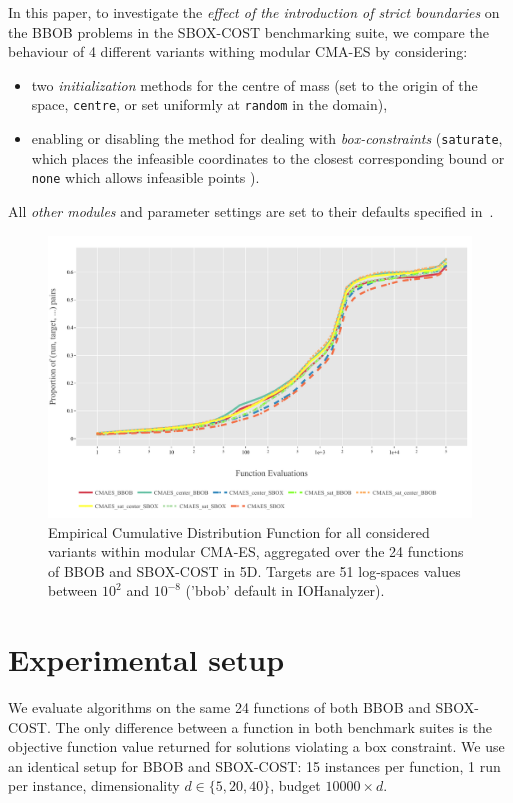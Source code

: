 \documentclass[sigconf=true, nonacm=false, review=true, anonymous = false,screen=true]{acmart}
\begin{document}
In this paper, to investigate the \textit{effect of the introduction of strict boundaries} on the BBOB problems in the SBOX-COST benchmarking suite, we compare the behaviour of 4 different variants withing modular CMA-ES by considering:
\begin{itemize}
    \item two \textit{initialization} methods for the centre of mass (set to the origin of the space, \texttt{centre}, or set uniformly at \texttt{random} in the domain),
    \item enabling or disabling the method for dealing with \textit{box-constraints} (\texttt{saturate}, which places the infeasible coordinates to the closest corresponding bound or \texttt{none} which allows infeasible points ). 
\end{itemize} 
All \textit{other modules} and parameter settings are set to their defaults specified in~\cite{de2021tuning}. 

\begin{figure}[!tb]
 \centering
 \includegraphics[width=.95\linewidth,trim=1mm 5mm 13mm 9mm,clip]{Figures/ECDF_5D_CMAESS.pdf}
 \caption{Empirical Cumulative Distribution Function for all considered variants within modular CMA-ES, aggregated over the 24 functions of BBOB and SBOX-COST in 5D. Targets are 51 log-spaces values between $10^2$ and $10^{-8}$ ('bbob' default in IOHanalyzer).}\label{fig:res_ecdf}
\end{figure}
\section{Experimental setup}
We evaluate algorithms on the same 24 functions of both BBOB and SBOX-COST. The only difference between a function in both benchmark suites is the objective function value returned for solutions violating a box constraint.
We use an identical setup for BBOB and SBOX-COST: 15 instances per function, 1 run per instance, dimensionality $d\in\{5, 20, 40\}$, budget $10000\times d$.
\end{document}
